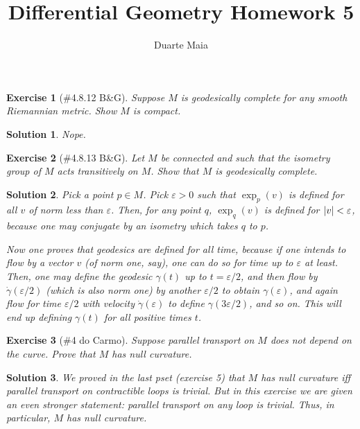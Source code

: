 \documentclass{article}
\title{Differential Geometry Homework 5}
\author{Duarte Maia}
\theoremstyle{plain}
\newtheorem*{ex}{Exercise}
\theoremstyle{nonumberplain}
\newtheorem{sol}{Solution}
\DeclarePairedDelimiter{\abs}{\lvert}{\rvert}
\begin{document}
\maketitle

\begin{ex}[\#4.8.12 B\&G]
Suppose $M$ is geodesically complete for any smooth Riemannian metric. Show $M$ is compact.
\end{ex}

\begin{sol}
Nope.
\end{sol}

\begin{ex}[\#4.8.13 B\&G]
Let $M$ be connected and such that the isometry group of $M$ acts transitively on $M$. Show that $M$ is geodesically complete.
\end{ex}

\begin{sol}
Pick a point $p \in M$. Pick $\varepsilon > 0$ such that $\exp_p(v)$ is defined for all $v$ of norm less than $\varepsilon$. Then, for \emph{any} point $q$, $\exp_q(v)$ is defined for $\abs v < \varepsilon$, because one may conjugate by an isometry which takes $q$ to $p$.

Now one proves that geodesics are defined for all time, because if one intends to flow by a vector $v$ (of norm one, say), one can do so for time up to $\varepsilon$ at least. Then, one may define the geodesic $\gamma(t)$ up to $t = \varepsilon/2$, and then flow by $\dot\gamma(\varepsilon/2)$ (which is also norm one) by another $\varepsilon/2$ to obtain $\gamma(\varepsilon)$, and again flow for time $\varepsilon/2$ with velocity $\dot\gamma(\varepsilon)$ to define $\gamma(3\varepsilon/2)$, and so on. This will end up defining $\gamma(t)$ for all positive times $t$.
\end{sol}

\begin{ex}[\#4 do Carmo]
Suppose parallel transport on $M$ does not depend on the curve. Prove that $M$ has null curvature.
\end{ex}

\begin{sol}
We proved in the last pset (exercise 5) that $M$ has null curvature iff parallel transport on contractible loops is trivial. But in this exercise we are given an even stronger statement: parallel transport on \emph{any} loop is trivial. Thus, in particular, $M$ has null curvature.
\end{sol}
\end{document}

